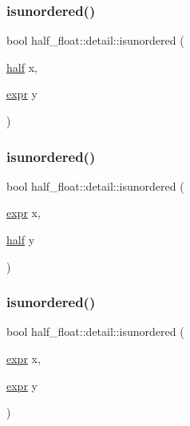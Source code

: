 \subsubsection{\texorpdfstring{isunordered()}{isunordered()}\hspace{0.1cm}{\footnotesize\ttfamily [2/4]}}
{\footnotesize\ttfamily bool half\+\_\+float\+::detail\+::isunordered (\begin{DoxyParamCaption}\item[{\hyperlink{classhalf__float_1_1half}{half}}]{x,  }\item[{\hyperlink{structhalf__float_1_1detail_1_1expr}{expr}}]{y }\end{DoxyParamCaption})\hspace{0.3cm}{\ttfamily [inline]}}

\mbox{\label{namespacehalf__float_1_1detail_ad479f10441ff35fd89038940623edf32}} 
\subsubsection{\texorpdfstring{isunordered()}{isunordered()}\hspace{0.1cm}{\footnotesize\ttfamily [3/4]}}
{\footnotesize\ttfamily bool half\+\_\+float\+::detail\+::isunordered (\begin{DoxyParamCaption}\item[{\hyperlink{structhalf__float_1_1detail_1_1expr}{expr}}]{x,  }\item[{\hyperlink{classhalf__float_1_1half}{half}}]{y }\end{DoxyParamCaption})\hspace{0.3cm}{\ttfamily [inline]}}

\mbox{\label{namespacehalf__float_1_1detail_a55803fd7a2045e188c2e23f312ef8390}} 
\subsubsection{\texorpdfstring{isunordered()}{isunordered()}\hspace{0.1cm}{\footnotesize\ttfamily [4/4]}}
{\footnotesize\ttfamily bool half\+\_\+float\+::detail\+::isunordered (\begin{DoxyParamCaption}\item[{\hyperlink{structhalf__float_1_1detail_1_1expr}{expr}}]{x,  }\item[{\hyperlink{structhalf__float_1_1detail_1_1expr}{expr}}]{y }\end{DoxyParamCaption})\hspace{0.3cm}{\ttfamily [inline]}}

